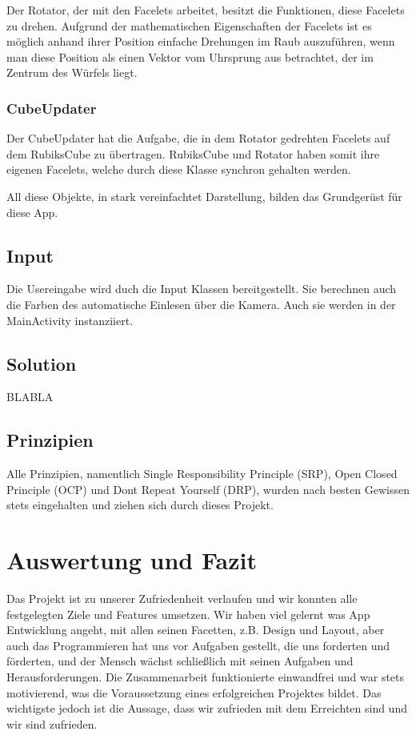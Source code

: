 Der Rotator, der mit den Facelets arbeitet, besitzt die Funktionen, diese
Facelets zu drehen. Aufgrund der mathematischen Eigenschaften der Facelets ist
es möglich anhand ihrer Position einfache Drehungen im Raub auszuführen, wenn
man diese Position als einen Vektor vom Uhrsprung aus betrachtet, der im Zentrum
des Würfels liegt.

\subsubsection{CubeUpdater}

Der CubeUpdater hat die Aufgabe, die in dem Rotator gedrehten Facelets auf dem
RubiksCube zu übertragen. RubiksCube und Rotator haben somit ihre eigenen
Facelets, welche durch diese Klasse synchron gehalten werden.

All diese Objekte, in stark vereinfachtet Darstellung, bilden das Grundgerüst
für diese App.

\subsection{Input}

Die Usereingabe wird duch die Input Klassen bereitgestellt. Sie berechnen auch
die Farben des automatische Einlesen über die Kamera. Auch sie werden in der
MainActivity instanziiert.

\subsection{Solution}

BLABLA




\subsection{Prinzipien}  %
Alle Prinzipien, namentlich Single Responsibility Principle (SRP), Open Closed
Principle (OCP) und Dont Repeat Yourself (DRP), wurden nach besten Gewissen stets
eingehalten und ziehen sich durch dieses Projekt.

\section{Auswertung und Fazit}  %

Das Projekt ist zu unserer Zufriedenheit verlaufen und wir konnten alle
festgelegten Ziele und Features umsetzen. Wir haben viel gelernt was App
Entwicklung angeht, mit allen seinen Facetten, z.B. Design und Layout, aber auch
das Programmieren hat uns vor Aufgaben gestellt, die uns forderten und
förderten, und der Mensch wächst schließlich mit seinen Aufgaben und
Herausforderungen. Die Zusammenarbeit funktionierte einwandfrei und war stets
motivierend, was die Voraussetzung eines erfolgreichen Projektes bildet. Das
wichtigste jedoch ist die Aussage, dass wir zufrieden mit dem Erreichten sind
und wir sind zufrieden.


\appendix
\printbibliography[heading=bibintoc,title={Quellenverzeichnis}]
\listoffigures


